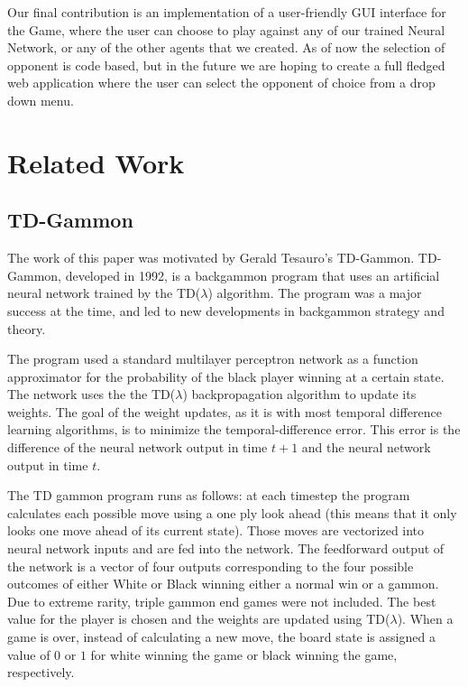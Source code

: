 \documentclass{sig-alternate-05-2015}
\begin{document}
Our final contribution is an implementation of a user-friendly GUI interface for the Game, where the user can choose to play against any of our trained Neural Network, or any of the other agents that we created. As of now the selection of opponent is code based, but in the future we are hoping to create a full fledged web application where the user can select the opponent of choice from a drop down menu. 



\section{Related Work}

\subsection{TD-Gammon}
The work of this paper was motivated by Gerald Tesauro's TD-Gammon. TD-Gammon, developed in 1992, is a backgammon program that uses an artificial neural network trained by the TD(\(\lambda\)) algorithm. The program was a major success at the time, and led to new developments in backgammon strategy and theory.

The program used a standard multilayer perceptron network as a function approximator for the probability of the black player winning at a certain state. The network uses the the TD(\(\lambda\)) backpropagation algorithm to update its weights. The goal of the weight updates, as it is with most temporal difference learning algorithms, is to minimize the temporal-difference error. This error is the difference of the neural network output in time $t+1$ and the neural network output in time $t$. 

The TD gammon program runs as follows: at each timestep the program calculates each possible move using a one ply look ahead (this means that it only looks one move ahead of its current state). Those moves are vectorized into neural network inputs and are fed into the network. The feedforward output of the network is a vector of four outputs corresponding to the four possible outcomes of either White or Black winning either a normal win or a gammon. Due to extreme rarity, triple gammon end games were not included. The best value for the player is chosen and the weights are updated using TD(\(\lambda\)). When a game is over, instead of calculating a new move, the board state is assigned a value of $0$ or $1$ for white winning the game or black winning the game, respectively. 
\end{document}
